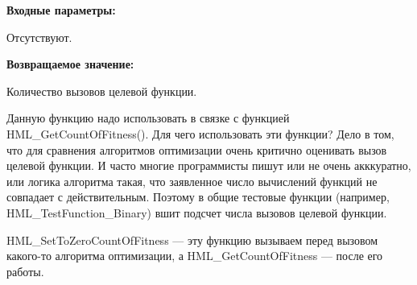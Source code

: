 \textbf{Входные параметры:}

Отсутствуют.

\textbf{Возвращаемое значение:}
 
Количество вызовов целевой функции.

Данную функцию надо использовать в связке с функцией HML\_GetCountOfFitness(). Для чего использовать эти функции? Дело в том, что для сравнения алгоритмов оптимизации очень критично оценивать вызов целевой функции. И часто многие программисты пишут или не очень акккуратно, или логика алгоритма такая, что заявленное число вычислений функций не совпадает с действительным. Поэтому в общие тестовые функции (например, HML\_TestFunction\_Binary) вшит подсчет числа вызовов целевой функции.

HML\_SetToZeroCountOfFitness --- эту функцию вызываем перед вызовом какого-то алгоритма оптимизации, а HML\_GetCountOfFitness --- после его работы.